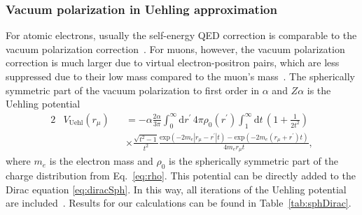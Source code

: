 \subsubsection{Vacuum polarization in Uehling approximation}
\label{sec:qed}

For atomic electrons, usually the self-energy QED correction is comparable to the vacuum polarization correction~\cite{Beier2000}. For muons, however, the vacuum polarization correction is much larger due to virtual electron-positron pairs, which are less suppressed due to their low mass compared to the muon's mass~\cite{BorieRinker1982}. The spherically symmetric part of the vacuum polarization to first order in $\alpha$ and $Z\alpha$ is the Uehling potential~\cite{Elizarov2005}
\begin{alignat}{2}
&V_{\text{Uehl}}(r_\mu)&&=-\alpha \frac{2\alpha}{3\pi}\int_0^\infty \text{d}r^{\prime}\,4\pi \rho_0(r^\prime)\int_1^\infty \text{d}t\,\left( 1+\frac{1}{2t^2} \right)\nonumber\\[7.5pt]
&&&\times\frac{\sqrt{t^2-1}}{t^2} \frac{\text{exp}(-2m_e|r_\mu-r^\prime|t)-\text{exp}(-2m_e(r_\mu+r^\prime)t)}{4m_er_\mu t},
\label{eq:uehl_2}
\end{alignat}
where $m_e$ is the electron mass and $\rho_0$ is the spherically symmetric part of the charge distribution from Eq.~\eqref{eq:rho}. This potential can be directly added to the Dirac equation \eqref{eq:diracSph}. In this way, all iterations of the Uehling potential are included~\cite{indelicato2013}. Results for our calculations can be found in Table~\ref{tab:sphDirac}.
%
%

